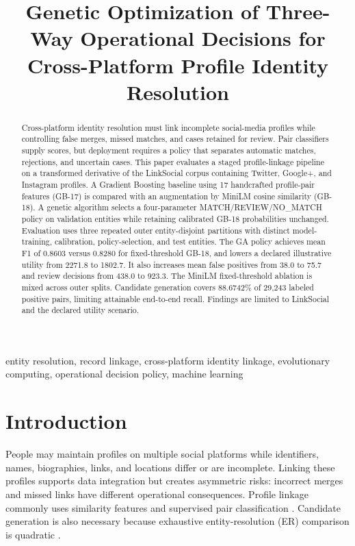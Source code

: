 \documentclass[conference]{IEEEtran}
\begin{document}
\title{Genetic Optimization of Three-Way Operational Decisions for Cross-Platform Profile Identity Resolution}
\author{}
\maketitle

\begin{abstract}
Cross-platform identity resolution must link incomplete social-media profiles while controlling false merges, missed matches, and cases retained for review. Pair classifiers supply scores, but deployment requires a policy that separates automatic matches, rejections, and uncertain cases. This paper evaluates a staged profile-linkage pipeline on a transformed derivative of the LinkSocial corpus containing Twitter, Google+, and Instagram profiles. A Gradient Boosting baseline using 17 handcrafted profile-pair features (GB-17) is compared with an augmentation by MiniLM cosine similarity (GB-18). A genetic algorithm selects a four-parameter MATCH/REVIEW/NO\_MATCH policy on validation entities while retaining calibrated GB-18 probabilities unchanged. Evaluation uses three repeated outer entity-disjoint partitions with distinct model-training, calibration, policy-selection, and test entities. The GA policy achieves mean F1 of 0.8603 versus 0.8280 for fixed-threshold GB-18, and lowers a declared illustrative utility from 2271.8 to 1802.7. It also increases mean false positives from 38.0 to 75.7 and review decisions from 438.0 to 923.3. The MiniLM fixed-threshold ablation is mixed across outer splits. Candidate generation covers 88.6742\% of 29,243 labeled positive pairs, limiting attainable end-to-end recall. Findings are limited to LinkSocial and the declared utility scenario.
\end{abstract}

\begin{IEEEkeywords}
entity resolution, record linkage, cross-platform identity linkage, evolutionary computing, operational decision policy, machine learning
\end{IEEEkeywords}

\section{Introduction}
People may maintain profiles on multiple social platforms while identifiers, names, biographies, links, and locations differ or are incomplete. Linking these profiles supports data integration but creates asymmetric risks: incorrect merges and missed links have different operational consequences. Profile linkage commonly uses similarity features and supervised pair classification \cite{sharma2018linksocial,yao2023profile}. Candidate generation is also necessary because exhaustive entity-resolution (ER) comparison is quadratic \cite{papadakis2021blocking,li2020blocking}.
\end{document}
